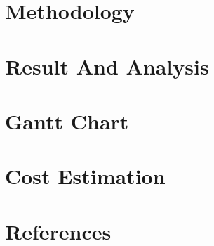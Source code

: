 \documentclass[12pt,a4paper]{report}
\begin{document}
\chapter{Methodology}
\label{methodology}


\chapter{Result And Analysis}
\label{result}


\chapter*{Gantt Chart}
\label{ganttchart}


\chapter*{Cost Estimation}
\label{cost estimation}


\chapter*{References}
\label{references}

\end{document}
